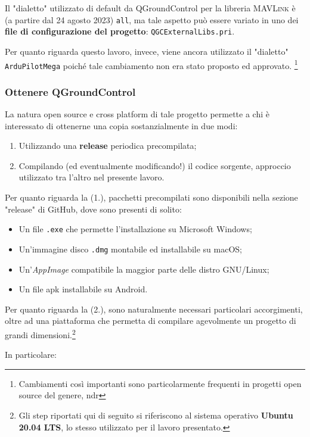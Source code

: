 \documentclass[a4paper, 12pt, oneside]{article}
\theoremstyle{definition}
\begin{document}
Il "dialetto" utilizzato di default da QGroundControl per la libreria \textsc{MAVLink} è (a partire dal 24 agosto 2023)\cite{qgc-all-commit} \texttt{all}, ma tale aspetto può essere variato in uno dei \textbf{file di configurazione del progetto}: \texttt{QGCExternalLibs.pri}.

Per quanto riguarda questo lavoro, invece, viene ancora utilizzato il "dialetto" \texttt{ArduPilotMega} poiché tale cambiamento non era stato proposto ed approvato. \footnote{Cambiamenti così importanti sono particolarmente frequenti in progetti open source del genere, ndr}

\subsubsection{Ottenere QGroundControl}
La natura open source e cross platform di tale progetto permette a chi è interessato di ottenerne una copia sostanzialmente in due modi:

\begin{enumerate}
    \item Utilizzando una \textbf{release} periodica precompilata;
    \item Compilando (ed eventualmente modificando!) il codice sorgente, approccio utilizzato tra l'altro nel presente lavoro.
\end{enumerate}

Per quanto riguarda la (1.), pacchetti precompilati sono disponibili nella sezione "release" di GitHub, dove sono presenti di solito:

\begin{itemize}
    \item Un file \texttt{.exe} che permette l'installazione su Microsoft Windows;
    \item Un'immagine disco \texttt{.dmg} montabile ed installabile su macOS;
    \item Un'\textit{AppImage} compatibile la maggior parte delle distro GNU/Linux;
    \item Un file apk installabile su Android.
\end{itemize}

Per quanto riguarda la (2.), sono naturalmente necessari particolari accorgimenti, oltre ad una piattaforma che permetta di compilare agevolmente un progetto di grandi dimensioni.\footnote{Gli step riportati qui di seguito si riferiscono al sistema operativo \textbf{Ubuntu 20.04 LTS}, lo stesso utilizzato per il lavoro presentato.}

In particolare:
\end{document}
